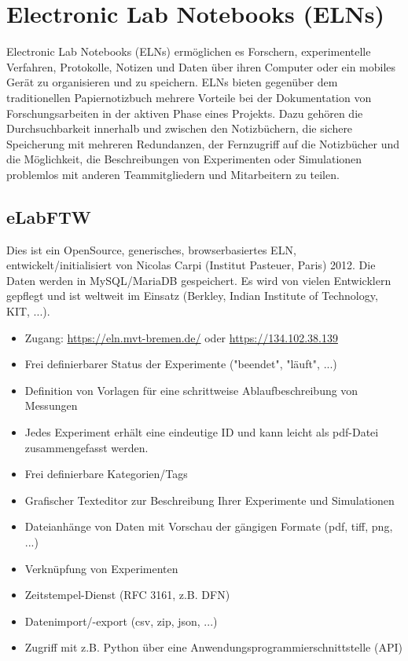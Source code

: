 \section[Electronic Lab Notebooks]{Electronic Lab Notebooks (ELNs)}\label{ssc:ELN}

Electronic Lab Notebooks (ELNs) ermöglichen es Forschern, experimentelle
Verfahren, Protokolle, Notizen und Daten über ihren Computer oder ein mobiles
Gerät zu organisieren und zu speichern. ELNs bieten gegenüber dem traditionellen
Papiernotizbuch mehrere Vorteile bei der Dokumentation von Forschungsarbeiten in
der aktiven Phase eines Projekts. Dazu gehören die Durchsuchbarkeit innerhalb
und zwischen den Notizbüchern, die sichere Speicherung mit mehreren Redundanzen,
der Fernzugriff auf die Notizbücher und die Möglichkeit, die Beschreibungen von
Experimenten oder Simulationen problemlos mit anderen Teammitgliedern und
Mitarbeitern zu teilen.

\subsection{eLabFTW}

Dies ist ein OpenSource, generisches, browserbasiertes ELN,
entwickelt/initialisiert von Nicolas Carpi (Institut Pasteuer, Paris) 2012. Die
Daten werden in MySQL/MariaDB gespeichert. Es wird von vielen Entwicklern
gepflegt und ist weltweit im Einsatz (Berkley, Indian Institute of Technology,
KIT, ...).
\begin{itemize}
  \item Zugang: \url{https://eln.mvt-bremen.de/} oder \url{https://134.102.38.139}
  \item Frei definierbarer Status der Experimente ("beendet", "läuft", ...)
  \item Definition von Vorlagen für eine schrittweise Ablaufbeschreibung von
        Messungen
  \item Jedes Experiment erhält eine eindeutige ID und kann leicht als pdf-Datei
        zusammengefasst werden.
  \item Frei definierbare Kategorien/Tags
  \item Grafischer Texteditor zur Beschreibung Ihrer Experimente und Simulationen
  \item Dateianhänge von Daten mit Vorschau der gängigen Formate (pdf, tiff,
        png, ...)
  \item Verknüpfung von Experimenten
  \item Zeitstempel-Dienst (RFC 3161, z.B. DFN)
  \item Datenimport/-export (csv, zip, json, ...)
  \item Zugriff mit z.B. Python über eine Anwendungsprogrammierschnittstelle (API)
\end{itemize}

